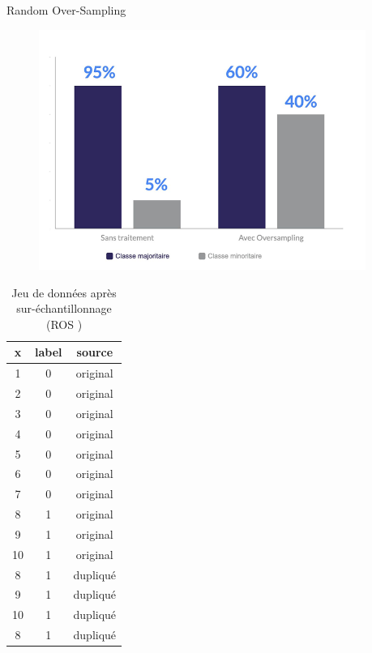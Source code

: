 \documentclass{beamer}
\begin{document}
\begin{frame}{Random Over-Sampling}
\begin{figure}
    \centering
    \includegraphics[width=0.95\textwidth]{images/ROS.png}
\end{figure}

\end{frame}

\begin{frame}
\begin{table}
\centering
\caption{Jeu de données après sur-échantillonnage (ROS )}
\begin{tabular}{|c|c|c|}
\hline
\textbf{x} & \textbf{label} & \textbf{source} \\
\hline
1   & 0 & original \\
2 &  0 & original \\
3 &  0 & original \\
4 &  0 & original \\
5 &  0 & original \\
6 &  0 & original \\
7 &  0 & original \\
8 &  1 & original \\
9 &  1 & original \\
10 &  1 & original \\
8 &  1 & dupliqué \\
 9 &  1 & dupliqué \\
 10 &  1 & dupliqué \\
 8 &  1 & dupliqué \\
\hline
\end{tabular}
\end{table}

\end{frame}
\end{document}
